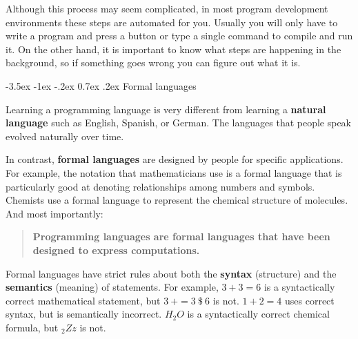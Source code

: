 \documentclass[12pt]{book}
\makeatletter
\theoremstyle{exercise}
\renewcommand{\section}{\@startsection {section}{1}{\z@}%
    {-3.5ex \@plus -1ex \@minus -.2ex}%
    {0.7ex \@plus.2ex}%
    {\normalfont\Large\bfseries}}
\renewcommand\subsection{\@startsection{subsection}{2}{\z@}%
    {-3.25ex\@plus -1ex \@minus -.2ex}%
    {0.3ex \@plus .2ex}%
    {\normalfont\large\bfseries}}
\makeatother
\begin{document}
Although this process may seem complicated, in most program development environments these steps are automated for you.
Usually you will only have to write a program and press a button or type a single command to compile and run it.
On the other hand, it is important to know what steps are happening in the background, so if something goes wrong you can figure out what it is.


\section{Formal languages}


Learning a programming language is very different from learning a {\bf natural language} such as English, Spanish, or German.
The languages that people speak evolved naturally over time.


In contrast, {\bf formal languages} are designed by people for specific applications.
For example, the notation that mathematicians use is a formal language that is particularly good at denoting relationships among numbers and symbols.
Chemists use a formal language to represent the chemical structure of molecules.
And most importantly:


\begin{quote}
{\bf Programming languages are formal languages that have been designed to express computations.}
\end{quote}


Formal languages have strict rules about both the {\bf syntax} (structure) and the {\bf semantics} (meaning) of statements.
For example, $3 + 3 = 6$ is a syntactically correct mathematical statement, but $3\ + = 3\ \$\ 6$ is not.
$1 + 2 = 4$ uses correct syntax, but is semantically incorrect.
$H_2O$ is a syntactically correct chemical formula, but $_2Zz$ is not.


\end{document}
